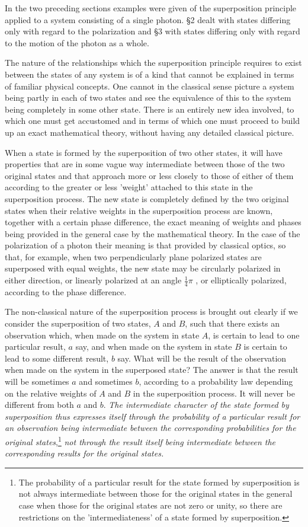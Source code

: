 In the two preceding sections examples were given of the superposition principle applied to a system consisting of a single photon.  \S 2 dealt with states differing only with regard to the polarization and \S 3 with states differing only with regard to the motion of the photon as a whole.

The nature of the relationships which the superposition principle requires to exist between the states of any system is of a kind that cannot be explained in terms of familiar physical concepts.  One cannot in the classical sense picture a system being partly in each of two states and see the equivalence of this to the system being completely in some other state.  There is an entirely new idea involved, to which one must get accustomed and in terms of which one must proceed to build up an exact mathematical theory, without having any detailed classical picture.

When a state is formed by the superposition of two other states, it will have properties that are in some vague way intermediate between those of the two original states and that approach more or less closely to those of either of them according to the greater or less 'weight' attached to this state in the superposition process.  The new state is completely defined by the two original states when their relative weights in the superposition process are known, together with a certain phase difference, the exact meaning of weights and phases being provided in the general case by the mathematical theory.  In the case of the polarization of a photon their meaning is that provided by classical optics, so that, for example, when two perpendicularly plane polarized states are superposed with equal weights, the new state may be circularly polarized in either direction, or linearly polarized at an angle $\frac{1}{4}\pi$ , or elliptically polarized, according to the phase difference.

The non-classical nature of the superposition process is brought out clearly if we consider the superposition of two states, $A$ and $B$, such that there exists an observation which, when made on the system in state $A$, is certain to lead to one particular result, $a$ say, and when made on the system in state $B$ is certain to lead to some different result, $b$ say.  What will be the result of the observation when made on the system in the superposed state?  The answer is that the result will be sometimes $a$ and sometimes $b$, according to a probability law depending on the relative weights of $A$ and $B$ in the superposition process.  It will never be different from both $a$ and $b$. \emph{The intermediate character of the state formed by superposition thus expresses itself through the probability of a particular result for an observation being intermediate between the corresponding probabilities for the original states},\footnote{The probability of a particular result for the state formed by superposition is not always intermediate between those for the original states in the general case when those for the original states are not zero or unity, so there are restrictions on the 'intermediateness' of a state formed by superposition.} \emph{not through the result itself being intermediate between the corresponding results for the original states.}

